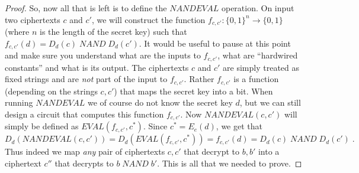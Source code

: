 \begin{proof}
So, now all that is left is to define the
\(\ensuremath{\mathit{NANDEVAL}}\) operation. On input two ciphertexts
\(c\) and \(c'\), we will construct the function
\(f_{c,c'}:\{0,1\}^n\rightarrow\{0,1\}\) (where \(n\) is the length of
the secret key) such that
\(f_{c,c'}(d)=D_d(c) \;\ensuremath{\mathit{NAND}}\; D_d(c')\). It would
be useful to pause at this point and make sure you understand what are
the inputs to \(f_{c,c'}\), what are ``hardwired constants'' and what is
its output. The ciphertexts \(c\) and \(c'\) are simply treated as fixed
strings and are \emph{not} part of the input to \(f_{c,c'}\). Rather
\(f_{c,c'}\) is a function (depending on the strings \(c,c'\)) that maps
the secret key into a bit. When running
\(\ensuremath{\mathit{NANDEVAL}}\) we of course do not know the secret
key \(d\), but we can still design a circuit that computes this function
\(f_{c,c'}\). Now \(\ensuremath{\mathit{NANDEVAL}}(c,c')\) will simply
be defined as \(\ensuremath{\mathit{EVAL}}(f_{c,c'},c^*)\). Since
\(c^* = E_e(d)\), we get that
\[D_d(\ensuremath{\mathit{NANDEVAL}}(c,c'))= D_d(\ensuremath{\mathit{EVAL}}(f_{c,c'},c^*))=f_{c,c'}(d) =D_d(c) \;\ensuremath{\mathit{NAND}}\; D_d(c') \;.\]
Thus indeed we map \emph{any} pair of ciphertexts \(c,c'\) that decrypt
to \(b,b'\) into a ciphertext \(c''\) that decrypts to
\(b \;\ensuremath{\mathit{NAND}}\; b'\). This is all that we needed to
prove.

\end{proof}

